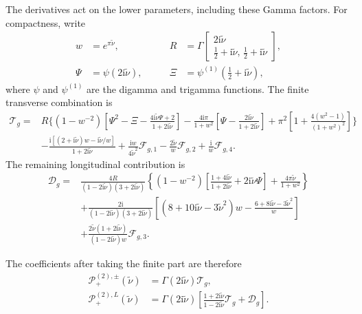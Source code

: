 \documentclass[a4paper,12pt]{article}
\def\ii{\mathrm{i}}
\begin{document}
The derivatives act on the lower parameters, including these Gamma factors.
For compactness, write
\begin{equation}
 \begin{alignedat}{2}
 w&=e^{\pi\tilde\nu},\qquad
 &R&=\Gamma\!\left[\begin{matrix}
 2\ii\tilde\nu\\
 \tfrac12+\ii\tilde\nu,\,\tfrac12+\ii\tilde\nu
 \end{matrix}\right],\\
 \Psi&=\psi(2\ii\tilde\nu),\qquad
 &\Xi&=\psi^{(1)}(\tfrac12+\ii\tilde\nu),
 \end{alignedat}
 \label{eq:gauge-finite-abbreviations}
\end{equation}
where $\psi$ and $\psi^{(1)}$ are the digamma and trigamma functions.
The finite transverse combination is
\begin{align}
 \mathcal T_g={}&R\Bigg\{
 (1-w^{-2})\left[\Psi^2-\Xi
 -\frac{4\ii\tilde\nu\Psi+2}{1+2\ii\tilde\nu}\right]
 -\frac{4\ii\pi}{1+w^2}
 \left[\Psi-\frac{2\ii\tilde\nu}{1+2\ii\tilde\nu}\right]
 +\pi^2\left[1+\frac{4(w^2-1)}{(1+w^2)^2}\right]\Bigg\}
 \nonumber\\
 &-\frac{\ii[(2+\ii\tilde\nu)w-\ii\tilde\nu/w]}{1+2\ii\tilde\nu}
 +\frac{\ii w}{4\tilde\nu^2}\mathcal F_{g,1}
 -\frac{2\tilde\nu}{w}\mathcal F_{g,2}
 +\frac{\ii}{w}\mathcal F_{g,4}.
 \label{eq:gauge-finite-T}
\end{align}
The remaining longitudinal contribution is
\begin{align}
 \mathcal D_g={}&\frac{4R}{(1-2\ii\tilde\nu)(3+2\ii\tilde\nu)}
 \left\{(1-w^{-2})\left[
 \frac{1+4\ii\tilde\nu}{1+2\ii\tilde\nu}+2\ii\tilde\nu\Psi\right]
 +\frac{4\pi\tilde\nu}{1+w^2}\right\}
 \nonumber\\
 &+\frac{2\ii}{(1-2\ii\tilde\nu)(3+2\ii\tilde\nu)}
 \left[(8+10\ii\tilde\nu-3\tilde\nu^2)w
 -\frac{6+8\ii\tilde\nu-3\tilde\nu^2}{w}\right]
 \nonumber\\
 &+\frac{2\tilde\nu(1+2\ii\tilde\nu)}{(1-2\ii\tilde\nu)w}
 \mathcal F_{g,3}.
 \label{eq:gauge-finite-D}
\end{align}

The coefficients after taking the finite part are therefore
\begin{align}
 \mathcal P^{(2),\pm}_{+}(\tilde\nu)
 &=\Gamma(2\ii\tilde\nu)\mathcal T_g,\nonumber\\
 \mathcal P^{(2),L}_{+}(\tilde\nu)
 &=\Gamma(2\ii\tilde\nu)
 \left[\frac{1+2\ii\tilde\nu}{1-2\ii\tilde\nu}\mathcal T_g
 +\mathcal D_g\right].
 \label{eq:gauge-P2-finite}
\end{align}
\end{document}
